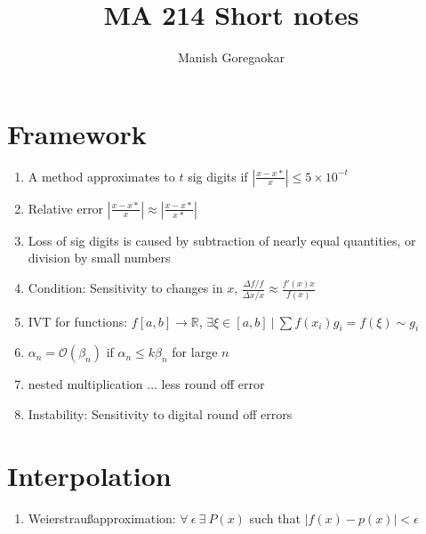\documentclass[12pt]{article}
\title{MA 214 Short notes}
\author{Manish Goregaokar}
\begin{document}
\maketitle
\section{Framework}
\begin{enumerate}
\item A method approximates to $t$ sig digits if $\left|\frac{x-x*}{x}\right|\leq 5\times 10^{-t}$
\item Relative error $\left|\frac{x-x*}{x}\right|\approx \left|\frac{x-x*}{x*}\right|$
\item Loss of sig digits is caused by subtraction of nearly equal quantities, or division by small numbers
\item Condition: Sensitivity to changes in $x$, $\frac{\Delta f/f}{\Delta x /x}\approx \frac{f'(x)x}{f(x)}$
\item IVT for functions: $f[a,b]\to\mathbb R$, $\exists \xi\in[a,b] ~|~\sum f(x_i)g_i=f(\xi)\sim g_i$
\item $\alpha_n =\mathcal O(\beta_n)$ if $\alpha_n\leq k\beta_n$ for large $n$
\item nested multiplication ... less round off error
\item Instability:  Sensitivity to digital round off errors

\end{enumerate}

\section{Interpolation}

\begin{enumerate}
\item Weierstrau\ss approximation: $\forall~\epsilon~\exists~P(x)$ such that $|f(x)-p(x)|<\epsilon$
\end{enumerate}
\end{document}
